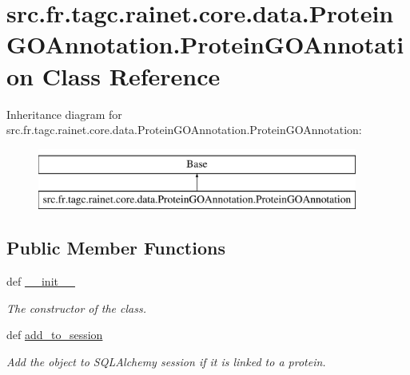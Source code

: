 \hypertarget{classsrc_1_1fr_1_1tagc_1_1rainet_1_1core_1_1data_1_1ProteinGOAnnotation_1_1ProteinGOAnnotation}{\section{src.\-fr.\-tagc.\-rainet.\-core.\-data.\-Protein\-G\-O\-Annotation.\-Protein\-G\-O\-Annotation Class Reference}
\label{classsrc_1_1fr_1_1tagc_1_1rainet_1_1core_1_1data_1_1ProteinGOAnnotation_1_1ProteinGOAnnotation}
}
Inheritance diagram for src.\-fr.\-tagc.\-rainet.\-core.\-data.\-Protein\-G\-O\-Annotation.\-Protein\-G\-O\-Annotation\-:\begin{figure}[H]
\begin{center}
\leavevmode
\includegraphics[height=2.000000cm]{classsrc_1_1fr_1_1tagc_1_1rainet_1_1core_1_1data_1_1ProteinGOAnnotation_1_1ProteinGOAnnotation}
\end{center}
\end{figure}
\subsection*{Public Member Functions}
\begin{DoxyCompactItemize}
\item 
def \hyperlink{classsrc_1_1fr_1_1tagc_1_1rainet_1_1core_1_1data_1_1ProteinGOAnnotation_1_1ProteinGOAnnotation_a2b232442863245169b32d69c8c73b2b0}{\-\_\-\-\_\-init\-\_\-\-\_\-}
\begin{DoxyCompactList}\small\item\em The constructor of the class. \end{DoxyCompactList}\item 
\hypertarget{classsrc_1_1fr_1_1tagc_1_1rainet_1_1core_1_1data_1_1ProteinGOAnnotation_1_1ProteinGOAnnotation_ac8dacfe3f5edd04ffaeee823dcc4370f}{def \hyperlink{classsrc_1_1fr_1_1tagc_1_1rainet_1_1core_1_1data_1_1ProteinGOAnnotation_1_1ProteinGOAnnotation_ac8dacfe3f5edd04ffaeee823dcc4370f}{add\-\_\-to\-\_\-session}}\label{classsrc_1_1fr_1_1tagc_1_1rainet_1_1core_1_1data_1_1ProteinGOAnnotation_1_1ProteinGOAnnotation_ac8dacfe3f5edd04ffaeee823dcc4370f}

\begin{DoxyCompactList}\small\item\em Add the object to S\-Q\-L\-Alchemy session if it is linked to a protein. \end{DoxyCompactList}\end{DoxyCompactItemize}
